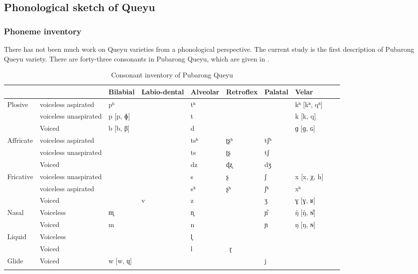 \documentclass[output=paper]{langscibook}
\begin{document}
\subsection{Phonological sketch of Queyu}\label{sec:guan:2.2}

\subsubsection{Phoneme inventory}\label{sec:guan:2.2.1}


There has not been much work on Queyu varieties from a phonological perspective. The current study is the first description of Pubarong Queyu variety. There are forty-three consonants in Pubarong Queyu, which are given in .

\begin{table}
\caption{Consonant inventory of Pubarong Queyu}
\label{tab:guan:1}
\begin{tabularx}{\textwidth}{Xlllllll@{}ll}
\lsptoprule
{} &   & {Bilabial} & {Labio-dental} & {Alveolar} & {Retroflex} & {Palatal} & {Velar}\\
\midrule
{{Plosive}} & {voiceless aspirated} & {pʰ} &   & {tʰ} &   &   & {kʰ [kʰ, qʰ]} &  \\
& {voiceless unaspirated} & {p [p, ɸ]} &   & {t} &   &   & {k [k, q]} &  \\
& {Voiced} & {b [b, β]} &   & {d} &   &   & {ɡ [ɡ, ɢ]} &  \\
{{Affricate}} & {voiceless aspirated} &   &   & {tsʰ} & {ʈʂʰ}  & {tʃʰ} &   &  \\
& {voiceless unaspirated} &   &   & {ts} & {ʈʂ} & {tʃ} &   &  \\
& {Voiced} &   &   & {dz} & {ɖʐ} & {dʒ} &   &  \\
{{Fricative}} & {voiceless unaspirated} &  &   & {s} & {ʂ} & {ʃ} & {x [x, χ, h]} & &\\
& {voiceless aspirated} &   &   & {sʰ} & {ʂʰ} & {ʃʰ} & {xʰ~} &  \\
& {Voiced} &  & {v} & {z} &  & {ʒ} & {ɣ [ɣ, ʁ]} &  \\
{{Nasal}} & {Voiceless} & {m̥} &   & {n̥} &   & {ɲ̊} & {ŋ̊ [ŋ̊, ɴ̊]} &  \\
& {Voiced} & {m} &   & {n} &   & {ɲ} & {ŋ [ŋ, ɴ]} &  \\
{{Liquid}} & {Voiceless} &   &   & {l̥} &  &   &   &  \\
& {Voiced} &   &   & {l} & {~ɽ~} &   &   &  \\
{{Glide}} & {Voiced} & {w [w, ɥ]} &   &   &   & {j} &   &  \\
\lspbottomrule
\end{tabularx}
\end{table}
\end{document}
